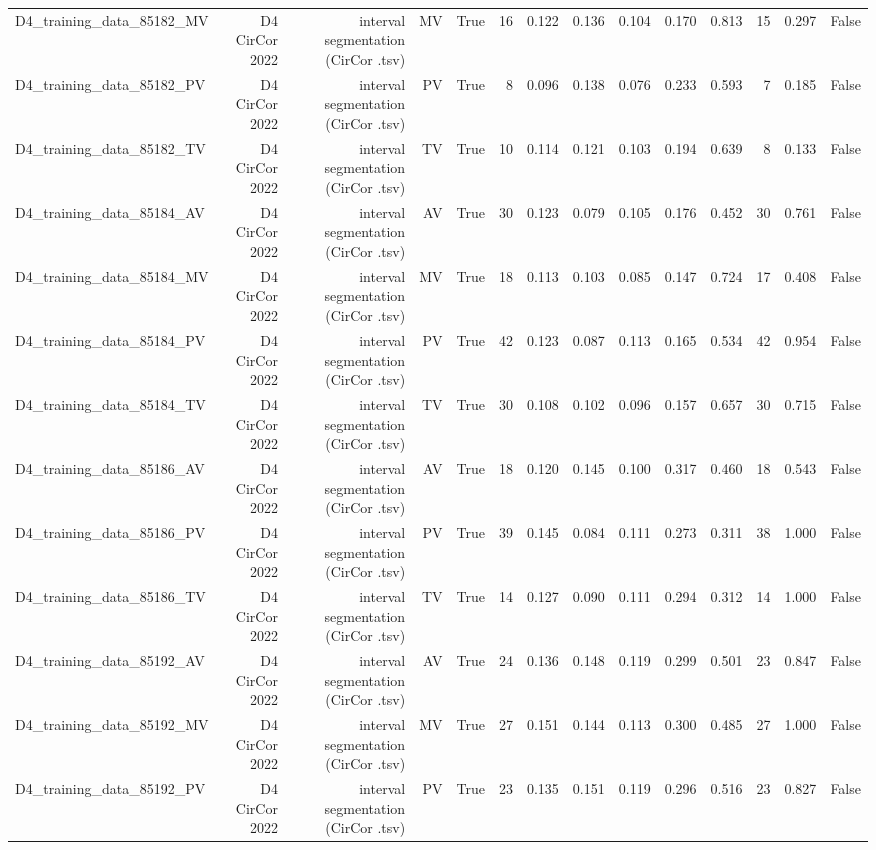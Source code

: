 \begin{table}[htbp]
\begin{tabular}{lrrrrrrrrrrrrr}
    D4\_training\_data\_85182\_MV & D4 CirCor 2022 & interval segmentation (CirCor .tsv) & MV & True & 16 & 0.122 & 0.136 & 0.104 & 0.170 & 0.813 & 15 & 0.297 & False \\
    D4\_training\_data\_85182\_PV & D4 CirCor 2022 & interval segmentation (CirCor .tsv) & PV & True & 8 & 0.096 & 0.138 & 0.076 & 0.233 & 0.593 & 7 & 0.185 & False \\
    D4\_training\_data\_85182\_TV & D4 CirCor 2022 & interval segmentation (CirCor .tsv) & TV & True & 10 & 0.114 & 0.121 & 0.103 & 0.194 & 0.639 & 8 & 0.133 & False \\
    D4\_training\_data\_85184\_AV & D4 CirCor 2022 & interval segmentation (CirCor .tsv) & AV & True & 30 & 0.123 & 0.079 & 0.105 & 0.176 & 0.452 & 30 & 0.761 & False \\
    D4\_training\_data\_85184\_MV & D4 CirCor 2022 & interval segmentation (CirCor .tsv) & MV & True & 18 & 0.113 & 0.103 & 0.085 & 0.147 & 0.724 & 17 & 0.408 & False \\
    D4\_training\_data\_85184\_PV & D4 CirCor 2022 & interval segmentation (CirCor .tsv) & PV & True & 42 & 0.123 & 0.087 & 0.113 & 0.165 & 0.534 & 42 & 0.954 & False \\
    D4\_training\_data\_85184\_TV & D4 CirCor 2022 & interval segmentation (CirCor .tsv) & TV & True & 30 & 0.108 & 0.102 & 0.096 & 0.157 & 0.657 & 30 & 0.715 & False \\
    D4\_training\_data\_85186\_AV & D4 CirCor 2022 & interval segmentation (CirCor .tsv) & AV & True & 18 & 0.120 & 0.145 & 0.100 & 0.317 & 0.460 & 18 & 0.543 & False \\
    D4\_training\_data\_85186\_PV & D4 CirCor 2022 & interval segmentation (CirCor .tsv) & PV & True & 39 & 0.145 & 0.084 & 0.111 & 0.273 & 0.311 & 38 & 1.000 & False \\
    D4\_training\_data\_85186\_TV & D4 CirCor 2022 & interval segmentation (CirCor .tsv) & TV & True & 14 & 0.127 & 0.090 & 0.111 & 0.294 & 0.312 & 14 & 1.000 & False \\
    D4\_training\_data\_85192\_AV & D4 CirCor 2022 & interval segmentation (CirCor .tsv) & AV & True & 24 & 0.136 & 0.148 & 0.119 & 0.299 & 0.501 & 23 & 0.847 & False \\
    D4\_training\_data\_85192\_MV & D4 CirCor 2022 & interval segmentation (CirCor .tsv) & MV & True & 27 & 0.151 & 0.144 & 0.113 & 0.300 & 0.485 & 27 & 1.000 & False \\
    D4\_training\_data\_85192\_PV & D4 CirCor 2022 & interval segmentation (CirCor .tsv) & PV & True & 23 & 0.135 & 0.151 & 0.119 & 0.296 & 0.516 & 23 & 0.827 & False \\

\end{tabular}
\end{table}
